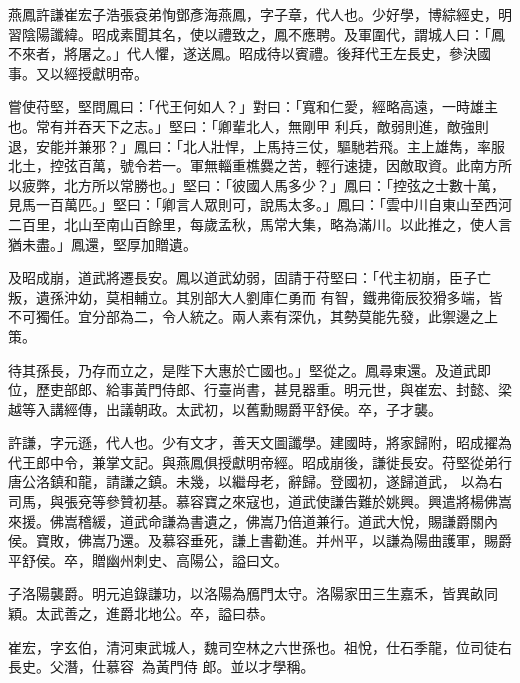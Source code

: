 
\begin{pinyinscope}

 燕鳳許謙崔宏子浩張袞弟恂鄧彥海燕鳳，字子章，代人也。少好學，博綜經史，明習陰陽讖緯。昭成素聞其名，使以禮致之，鳳不應聘。及軍圍代，謂城人曰：「鳳不來者，將屠之。」代人懼，遂送鳳。昭成待以賓禮。後拜代王左長史，參決國事。又以經授獻明帝。



 嘗使苻堅，堅問鳳曰：「代王何如人？」對曰：「寬和仁愛，經略高遠，一時雄主也。常有并吞天下之志。」堅曰：「卿輩北人，無剛甲
 利兵，敵弱則進，敵強則退，安能并兼邪？」鳳曰：「北人壯悍，上馬持三仗，驅馳若飛。主上雄雋，率服北土，控弦百萬，號令若一。軍無輜重樵爨之苦，輕行速捷，因敵取資。此南方所以疲弊，北方所以常勝也。」堅曰：「彼國人馬多少？」鳳曰：「控弦之士數十萬，見馬一百萬匹。」堅曰：「卿言人眾則可，說馬太多。」鳳曰：「雲中川自東山至西河二百里，北山至南山百餘里，每歲孟秋，馬常大集，略為滿川。以此推之，使人言猶未盡。」鳳還，堅厚加贈遺。



 及昭成崩，道武將遷長安。鳳以道武幼弱，固請于苻堅曰：「代主初崩，臣子亡叛，遺孫沖幼，莫相輔立。其別部大人劉庫仁勇而
 有智，鐵弗衛辰狡猾多端，皆不可獨任。宜分部為二，令人統之。兩人素有深仇，其勢莫能先發，此禦邊之上策。



 待其孫長，乃存而立之，是陛下大惠於亡國也。」堅從之。鳳尋東還。及道武即位，歷吏部郎、給事黃門侍郎、行臺尚書，甚見器重。明元世，與崔宏、封懿、梁越等入講經傳，出議朝政。太武初，以舊勳賜爵平舒侯。卒，子才襲。



 許謙，字元遜，代人也。少有文才，善天文圖讖學。建國時，將家歸附，昭成擢為代王郎中令，兼掌文記。與燕鳳俱授獻明帝經。昭成崩後，謙徙長安。苻堅從弟行唐公洛鎮和龍，請謙之鎮。未幾，以繼母老，辭歸。登國初，遂歸道武，
 以為右司馬，與張兗等參贊初基。慕容寶之來寇也，道武使謙告難於姚興。興遣將楊佛嵩來援。佛嵩稽緩，道武命謙為書遺之，佛嵩乃倍道兼行。道武大悅，賜謙爵關內侯。寶敗，佛嵩乃還。及慕容垂死，謙上書勸進。并州平，以謙為陽曲護軍，賜爵平舒侯。卒，贈幽州刺史、高陽公，謚曰文。



 子洛陽襲爵。明元追錄謙功，以洛陽為鴈門太守。洛陽家田三生嘉禾，皆異畝同穎。太武善之，進爵北地公。卒，謚曰恭。



 崔宏，字玄伯，清河東武城人，魏司空林之六世孫也。祖悅，仕石季龍，位司徒右長史。父潛，仕慕容，為黃門侍
 郎。並以才學稱。




\end{pinyinscope}
